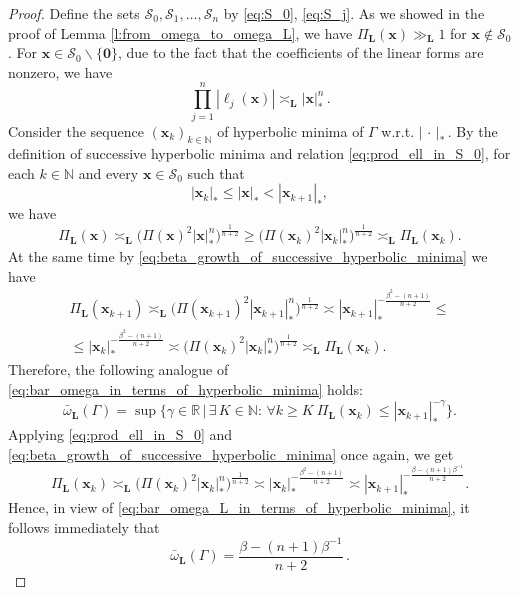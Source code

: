 \documentclass[a4paper,12pt]{article}
\theoremstyle{definition}
\theoremstyle{remark}
\theoremstyle{plain}
\renewcommand{\vec}[1]{\mathbf{#1}}
\renewcommand{\geq}{\geqslant}
\renewcommand{\leq}{\leqslant}
\newcommand{\R}{\mathbb{R}}
\newcommand{\N}{\mathbb{N}}
\newcommand{\Ga}{\Gamma}
\newcommand{\cS}{\mathcal{S}}
\newcommand{\bL}{\mathbf{L}}
\begin{document}
\begin{proof}
  Define the sets $\cS_0,\cS_1,\ldots,\cS_n$ by \eqref{eq:S_0}, \eqref{eq:S_j}. As we showed in the proof of Lemma \ref{l:from_omega_to_omega_L}, we have $\Pi_\bL(\vec x)\gg_\bL1$ for $\vec x\notin\cS_0$. For $\vec x\in\cS_0\backslash\{\vec 0\}$, due to the fact that the coefficients of the linear forms are nonzero, we have
  \begin{equation}\label{eq:prod_ell_in_S_0}
    \prod_{j=1}^n|\ell_j(\vec x)|\asymp_\bL|\vec x|_\ast^n\,.
  \end{equation}
  Consider the sequence $(\vec x_k)_{k\in\N}$ of hyperbolic minima of $\Ga$ w.r.t. $|\,\cdot\,|_\ast$\,. By the definition of successive hyperbolic minima and relation \eqref{eq:prod_ell_in_S_0}, for each $k\in\N$ and every $\vec x\in\cS_0$ such that
  \[
    |\vec x_k|_\ast\leq|\vec x|_\ast<|\vec x_{k+1}|_\ast,
  \]
  we have
  \[
    \Pi_\bL(\vec x)\asymp_\bL
    \Big(\Pi(\vec x)^2|\vec x|_\ast^n\Big)^{\frac1{n+2}}\geq
    \Big(\Pi(\vec x_k)^2|\vec x_k|_\ast^n\Big)^{\frac1{n+2}}\asymp_\bL
    \Pi_\bL(\vec x_k).
  \]
  At the same time by \eqref{eq:beta_growth_of_successive_hyperbolic_minima} we have
  \begin{multline*}
    \Pi_\bL(\vec x_{k+1})
    \asymp_\bL
    \Big(\Pi(\vec x_{k+1})^2|\vec x_{k+1}|_\ast^n\Big)^{\frac1{n+2}}
    \asymp
    |\vec x_{k+1}|_\ast^{-\frac{\beta^2-(n+1)}{n+2}}
    \leq \\ \leq
    |\vec x_k|_\ast^{-\frac{\beta^2-(n+1)}{n+2}}
    \asymp
    \Big(\Pi(\vec x_k)^2|\vec x_k|_\ast^n\Big)^{\frac1{n+2}}
    \asymp_\bL
    \Pi_\bL(\vec x_k).
  \end{multline*}
  Therefore, the following analogue of \eqref{eq:bar_omega_in_terms_of_hyperbolic_minima} holds:
  \begin{equation}\label{eq:bar_omega_L_in_terms_of_hyperbolic_minima}
    \bar\omega_\bL(\Ga)=\sup\Big\{ \gamma\in\R \,\Big|\, \exists\,K\in\N:\,\forall k\geq K\ \Pi_\bL(\vec x_k)\leq|\vec x_{k+1}|_\ast^{-\gamma} \Big\}.
  \end{equation}
  Applying \eqref{eq:prod_ell_in_S_0} and \eqref{eq:beta_growth_of_successive_hyperbolic_minima} once again, we get
  \[
    \Pi_\bL(\vec x_k)\asymp_\bL
    \Big(\Pi(\vec x_k)^2|\vec x_k|_\ast^n\Big)^{\frac1{n+2}}\asymp
    |\vec x_k|_\ast^{-\frac{\beta^2-(n+1)}{n+2}}\asymp
    |\vec x_{k+1}|_\ast^{-\frac{\beta-(n+1)\beta^{-1}}{n+2}}.
  \]
  Hence, in view of \eqref{eq:bar_omega_L_in_terms_of_hyperbolic_minima}, it follows immediately that
  \[
    \bar\omega_\bL(\Ga)=
    \dfrac{\beta-(n+1)\beta^{-1}}{n+2}\,.
  \]
\end{proof}
\end{document}
